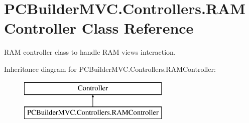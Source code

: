 \hypertarget{class_p_c_builder_m_v_c_1_1_controllers_1_1_r_a_m_controller}{}\section{P\+C\+Builder\+M\+V\+C.\+Controllers.\+R\+A\+M\+Controller Class Reference}
\label{class_p_c_builder_m_v_c_1_1_controllers_1_1_r_a_m_controller}


R\+AM controller class to handle R\+AM views interaction.  


Inheritance diagram for P\+C\+Builder\+M\+V\+C.\+Controllers.\+R\+A\+M\+Controller\+:\begin{figure}[H]
\begin{center}
\leavevmode
\includegraphics[height=2.000000cm]{class_p_c_builder_m_v_c_1_1_controllers_1_1_r_a_m_controller}
\end{center}
\end{figure}
